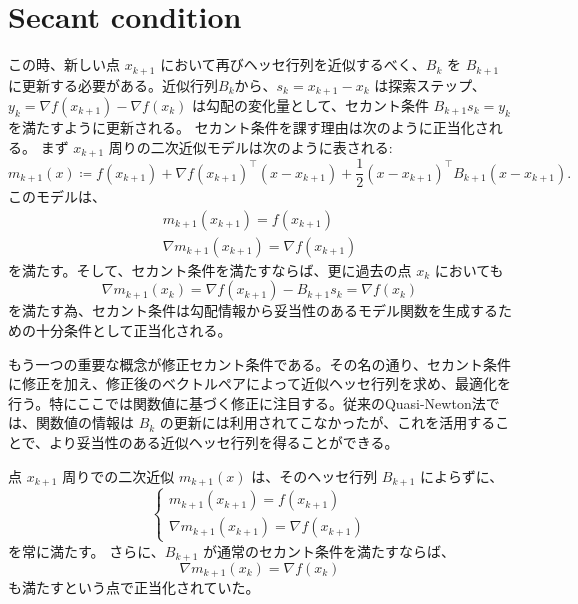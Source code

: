 \documentclass[a4paper, 10pt, dvipdfmx,draft]{article}
\newcommand{\defeq}{\coloneqq}
\begin{document}
\section{Secant condition}

この時、新しい点 $x_{k+1}$ において再びヘッセ行列を近似するべく、$B_k$ を $B_{k+1}$ に更新する必要がある。近似行列$B_k$から、$s_k = x_{k+1} - x_k$ は探索ステップ、$y_k = \nabla f(x_{k+1}) - \nabla f(x_k)$ は勾配の変化量として、セカント条件 $B_{k+1} s_k = y_k$ を満たすように更新される。
セカント条件を課す理由は次のように正当化される。
まず $x_{k+1}$ 周りの二次近似モデルは次のように表される:
\begin{equation*}
    m_{k+1}(x) \defeq f(x_{k+1}) + \nabla f(x_{k+1})^\top (x - x_{k+1}) + \frac{1}{2} (x - x_{k+1})^\top B_{k+1} (x - x_{k+1}).
\end{equation*}
このモデルは、
\begin{gather*}
    m_{k+1}(x_{k+1}) = f(x_{k+1})\\
    \nabla m_{k+1}(x_{k+1}) = \nabla f(x_{k+1})
\end{gather*}
を満たす。そして、セカント条件を満たすならば、更に過去の点 $x_k$ においても
\begin{equation*}
    \nabla m_{k+1}(x_k) = \nabla f(x_{k+1}) - B_{k+1} s_k = \nabla f(x_{k})
\end{equation*}
を満たす為、セカント条件は勾配情報から妥当性のあるモデル関数を生成するための十分条件として正当化される。

もう一つの重要な概念が修正セカント条件である\citep{hassanModifiedSecantEquation2023}。その名の通り、セカント条件に修正を加え、修正後のベクトルペアによって近似ヘッセ行列を求め、最適化を行う。特にここでは関数値に基づく修正に注目する。従来のQuasi-Newton法では、関数値の情報は $B_k$ の更新には利用されてこなかったが、これを活用することで、より妥当性のある近似ヘッセ行列を得ることができる。

点 $x_{k+1}$ 周りでの二次近似 $m_{k+1}(x)$ は、そのヘッセ行列 $B_{k+1}$ によらずに、
\begin{equation}
    \begin{cases}
        m_{k+1}(x_{k+1}) = f(x_{k+1}) \\
        \nabla m_{k+1}(x_{k+1}) = \nabla f(x_{k+1})
    \end{cases} \label{eq:msec_xkp1}
\end{equation}
を常に満たす。
さらに、$B_{k+1}$ が通常のセカント条件を満たすならば、
\begin{equation}\label{eq:msec_gxk}
    \nabla m_{k+1}(x_k) = \nabla f(x_k)
\end{equation}
も満たすという点で正当化されていた。
\end{document}
